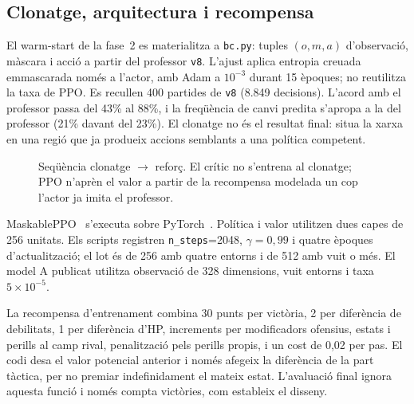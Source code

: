 \subsection{Clonatge, arquitectura i recompensa}

El warm-start de la fase~2 es materialitza a \texttt{bc.py}: tuples $(o,m,a)$ d'observació, màscara i acció a partir del professor \texttt{v8}. L'ajust aplica entropia creuada emmascarada només a l'actor, amb Adam a $10^{-3}$ durant 15 èpoques; no reutilitza la taxa de PPO. Es recullen 400 partides de \texttt{v8} (8.849 decisions). L'acord amb el professor passa del 43\% al 88\%, i la freqüència de canvi predita s'apropa a la del professor (21\% davant del 23\%). El clonatge no és el resultat final: situa la xarxa en una regió que ja produeix accions semblants a una política competent.

\begin{figure}[htbp]
    \centering
    \caption{Seqüència clonatge $\rightarrow$ reforç. El crític no s'entrena al clonatge; PPO n'aprèn el valor a partir de la recompensa modelada un cop l'actor ja imita el professor.}
    \label{fig:bc_then_ppo}
\end{figure}

MaskablePPO~\cite{sb3_contrib,ppo,raffin_sb3_jmlr} s'executa sobre PyTorch~\cite{pytorch}. Política i valor utilitzen dues capes de 256 unitats. Els scripts registren \texttt{n\_steps}=2048, $\gamma=0{,}99$ i quatre èpoques d'actualització; el lot és de 256 amb quatre entorns i de 512 amb vuit o més. El model A publicat utilitza observació de 328 dimensions, vuit entorns i taxa $5\times 10^{-5}$.

La recompensa d'entrenament combina 30 punts per victòria, 2 per diferència de debilitats, 1 per diferència d'HP, increments per modificadors ofensius, estats i perills al camp rival, penalització pels perills propis, i un cost de 0,02 per pas. El codi desa el valor potencial anterior i només afegeix la diferència de la part tàctica, per no premiar indefinidament el mateix estat. L'avaluació final ignora aquesta funció i només compta victòries, com estableix el disseny.

